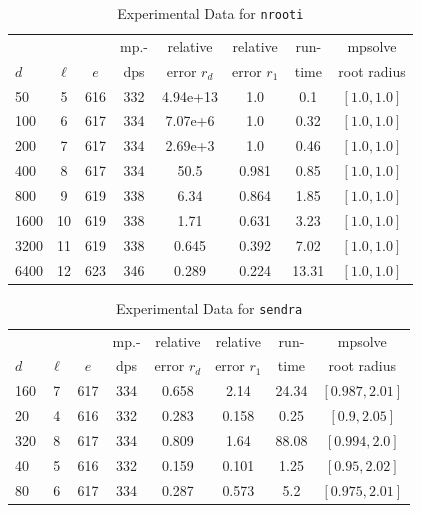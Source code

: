 \documentclass[runningheads]{llncs}
\begin{document}
\begin{table}
\caption{Experimental Data for \texttt{nrooti}} %
\label{tab:nrooti}
\vskip -0.15in
\begin{center}
\begin{small}
\begin{sc}
\begin{tabular}{lccccccc}
\toprule
&  &  & mp.-& relative  & relative & run- & mpsolve \\
$d$& $\ell$& $e$ & dps&error $r_d$       & error $r_1$ &time& root radius\\
\midrule
 50 & 5 & 616 & 332 & 4.94e+13 & 1.0 & 0.1 & $[1.0, 1.0]$\\
 100 & 6 & 617 & 334 & 7.07e+6 & 1.0 & 0.32 & $[1.0, 1.0]$\\
  200 & 7 & 617 & 334 & 2.69e+3 & 1.0 & 0.46 & $[1.0, 1.0]$\\
 400 & 8 & 617 & 334 & 50.5 & 0.981 & 0.85 & $[1.0, 1.0]$\\
 800 & 9 & 619 & 338 & 6.34 & 0.864 & 1.85 & $[1.0, 1.0]$\\
 1600 & 10 & 619 & 338 & 1.71 & 0.631 & 3.23 & $[1.0, 1.0]$\\
 3200 & 11 & 619 & 338 & 0.645 & 0.392 & 7.02 & $[1.0, 1.0]$\\
 6400 & 12 & 623 & 346 & 0.289 & 0.224 & 13.31 & $[1.0, 1.0]$\\
\bottomrule
\end{tabular}
\end{sc}
\end{small}
\end{center}
\vskip 0.05in
\end{table}

\begin{table}
\caption{Experimental Data for \texttt{sendra}} %
\label{tab:sendra}
\vskip -0.15in
\begin{center}
\begin{small}
\begin{sc}
\begin{tabular}{lccccccc}
\toprule
&  &  & mp.-& relative  & relative & run- & mpsolve \\
$d$& $\ell$& $e$ & dps&error $r_d$       & error $r_1$ &time& root radius\\
\midrule
 160 & 7 & 617 & 334 & 0.658 & 2.14 & 24.34 & $[0.987, 2.01]$\\
 20 & 4 & 616 & 332 & 0.283 & 0.158 & 0.25 & $[0.9, 2.05]$\\
 320 & 8 & 617 & 334 & 0.809 & 1.64 & 88.08 & $[0.994, 2.0]$\\
 40 & 5 & 616 & 332 & 0.159 & 0.101 & 1.25 & $[0.95, 2.02]$\\
 80 & 6 & 617 & 334 & 0.287 & 0.573 & 5.2 & $[0.975, 2.01]$\\
\bottomrule
\end{tabular}
\end{sc}
\end{small}
\end{center}
\vskip 0.05in
\end{table}
\end{document}
